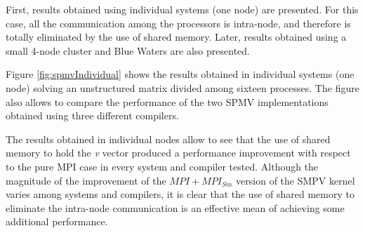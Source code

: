 \medskip

First, results obtained using individual systems (one node) are presented. For this case, all the communication among the processors is intra-node, and therefore is totally eliminated by the use of shared memory. Later, results obtained using a small 4-node cluster and Blue Waters are also presented.

\medskip

Figure \ref{fig:spmvIndividual} shows the results obtained in individual systems (one node) solving an unstructured matrix divided among sixteen processes. The figure also allows to compare the performance of the two SPMV implementations obtained using three different compilers. 


\medskip

The results obtained in individual nodes allow to see that the use of shared memory to hold the \emph{v} vector produced a performance improvement with respect to the pure MPI case in every system and compiler tested. Although the magnitude of the improvement of the $MPI+MPI_{Sm}$ version of the SMPV kernel varies among systems and compilers, it is clear that the use of shared memory to eliminate the intra-node communication is an effective mean of achieving some additional performance.




